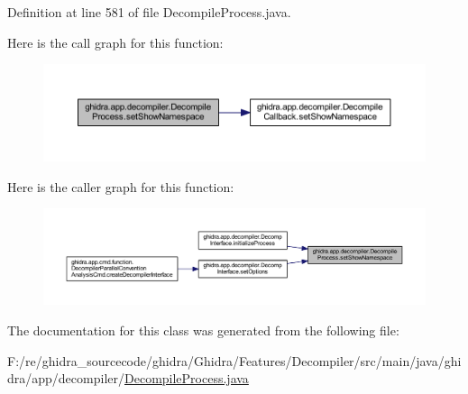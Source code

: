 Definition at line 581 of file Decompile\+Process.\+java.

Here is the call graph for this function\+:
\nopagebreak
\begin{figure}[H]
\begin{center}
\leavevmode
\includegraphics[width=350pt]{classghidra_1_1app_1_1decompiler_1_1_decompile_process_a86fcccae24b54cd29f7936b7aae7ece8_cgraph}
\end{center}
\end{figure}
Here is the caller graph for this function\+:
\nopagebreak
\begin{figure}[H]
\begin{center}
\leavevmode
\includegraphics[width=350pt]{classghidra_1_1app_1_1decompiler_1_1_decompile_process_a86fcccae24b54cd29f7936b7aae7ece8_icgraph}
\end{center}
\end{figure}


The documentation for this class was generated from the following file\+:\begin{DoxyCompactItemize}
\item 
F\+:/re/ghidra\+\_\+sourcecode/ghidra/\+Ghidra/\+Features/\+Decompiler/src/main/java/ghidra/app/decompiler/\mbox{\hyperlink{_decompile_process_8java}{Decompile\+Process.\+java}}\end{DoxyCompactItemize}

